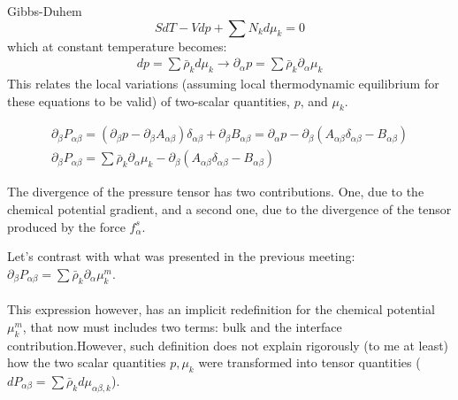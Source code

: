 \documentclass[8pt]{beamer}
\newcommand{\kronecker}{\delta_{\alpha \beta}}
\begin{document}
	\begin{frame}[t]{Gibbs-Duhem}
		\begin{equation*}
			SdT - V dp + \sum N_k d\mu_k = 0
		\end{equation*}
		which at constant temperature becomes:
		\begin{equation*}
			\begin{split}
				dp = \sum \bar{\rho}_k  d\mu_k  \rightarrow \partial_\alpha p = \sum \bar{\rho}_k  \partial_\alpha \mu_k
			\end{split}
		\end{equation*}
	This relates the local variations (assuming local thermodynamic equilibrium for these equations to be valid) of two-scalar quantities, $p$, and $\mu_k$. 
	
	\begin{equation*}
		\begin{split}
		\partial_\beta P_{\alpha\beta} = (\partial_\beta p - \partial_\beta A_{\alpha\beta} ) \kronecker + \partial_\beta B_{\alpha\beta} = \partial_\alpha p - \partial_\beta ( A_{\alpha\beta} \kronecker  - B_{\alpha\beta} )\\
		\partial_\beta P_{\alpha\beta} = \sum \bar{\rho}_k  \partial_\alpha \mu_k - \partial_\beta ( A_{\alpha\beta} \kronecker  - B_{\alpha\beta} )
		\end{split}
	\end{equation*}
	
	The divergence of the pressure tensor has two contributions. One, due to the chemical potential gradient, and a second one, due to the divergence of the tensor produced by the force $f^s_\alpha$.
	
	Let's contrast with what was presented in the previous meeting: $\partial_\beta P_{\alpha\beta} = \sum \bar{\rho}_k  \partial_\alpha \mu^m_k$.
	~\\~\\
	
	This expression however, has an implicit redefinition for the chemical potential $\mu^m_k$, that now must includes two terms: bulk and the interface contribution.However, such definition does not explain rigorously (to me at least) how the two scalar quantities $p, \mu_k$ were transformed into tensor quantities ($d P_{\alpha\beta} = \sum \bar{\rho}_k d\mu_{\alpha\beta,k}$).
	\end{frame}
	
\end{document}

